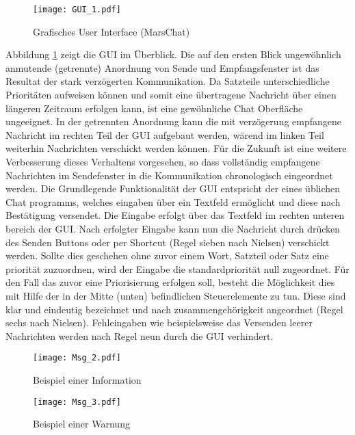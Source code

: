 \begin{figure}[H]
\centering
\texttt{[image: GUI\_1.pdf]}
\caption{Grafisches User Interface (MarsChat)}
\label{fig:GUI}
\end{figure}

Abbildung \ref{fig:GUI} zeigt die GUI im {\"U}berblick. Die auf den
ersten Blick ungew{\"o}hnlich anmutende (getrennte) Anordnung von Sende und
Empfangsfenster ist das Resultat der stark verz{\"o}gerten Kommunikation. Da
Satzteile unterschiedliche Priorit{\"a}ten aufweisen k{\"o}nnen und somit eine
{\"u}bertragene Nachricht {\"u}ber einen l{\"a}ngeren Zeitraum erfolgen kann,
ist eine gew{\"o}hnliche Chat Oberfl{\"a}che ungeeignet. In der getrennten
Anordnung kann die mit verz{\"o}gerung empfangene Nachricht im rechten Teil der
GUI aufgebaut werden, w{\"a}rend im linken Teil weiterhin Nachrichten verschickt
werden k{\"o}nnen. F{\"u}r die Zukunft ist eine weitere Verbesserung dieses
Verhaltens vorgesehen, so dass vollst{\"a}ndig empfangene Nachrichten im
Sendefenster in die Kommunikation chronologisch eingeordnet werden. Die
Grundlegende Funktionalit{\"a}t der GUI entspricht der eines {\"u}blichen Chat
programms, welches eingaben {\"u}ber ein Textfeld erm{\"o}glicht und diese nach
Best{\"a}tigung versendet. Die Eingabe erfolgt {\"u}ber das Textfeld im rechten unteren
bereich der GUI. Nach erfolgter Eingabe kann nun die Nachricht durch dr{\"u}cken des
Senden Buttons oder per Shortcut (Regel sieben nach Nielsen) verschickt werden.
Sollte dies geschehen ohne zuvor einem Wort, Satzteil oder Satz eine priorit{\"a}t zuzuordnen, wird der Eingabe
die standardpriorit{\"a}t null zugeordnet. F{\"u}r den Fall das zuvor eine
Priorisierung erfolgen soll, besteht die M{\"o}glichkeit dies mit Hilfe der in
der Mitte (unten) befindlichen Steuerelemente zu tun. Diese sind klar und
eindeutig bezeichnet und nach zusammengeh{\"o}rigkeit angeordnet (Regel sechs
nach Nielsen). Fehleingaben wie beispielsweise das Versenden leerer Nachrichten
werden nach Regel neun durch die GUI verhindert.

\begin{figure}[H]
\centering
\texttt{[image: Msg\_2.pdf]}
\caption{Beispiel einer Information}
\label{fig:Msg2}
\end{figure}

\begin{figure}[H]
\centering
\texttt{[image: Msg\_3.pdf]}
\caption{Beispiel einer Warnung}
\label{fig:Msg3}
\end{figure}

